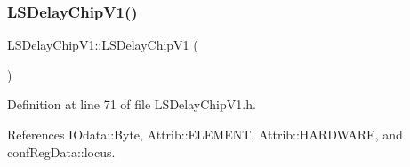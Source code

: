 \subsubsection{\texorpdfstring{L\+S\+Delay\+Chip\+V1()}{LSDelayChipV1()}}
{\footnotesize\ttfamily L\+S\+Delay\+Chip\+V1\+::\+L\+S\+Delay\+Chip\+V1 (\begin{DoxyParamCaption}{ }\end{DoxyParamCaption})\hspace{0.3cm}{\ttfamily [inline]}}



Definition at line 71 of file L\+S\+Delay\+Chip\+V1.\+h.



References I\+Odata\+::\+Byte, Attrib\+::\+E\+L\+E\+M\+E\+NT, Attrib\+::\+H\+A\+R\+D\+W\+A\+RE, and conf\+Reg\+Data\+::locus.


